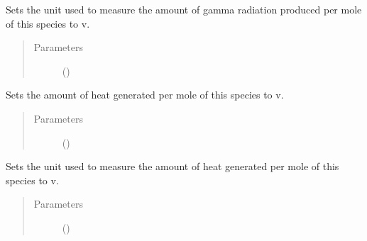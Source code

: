 \documentclass[letterpaper,10pt,openany,oneside,english]{sphinxmanual}
\begin{document}
\begin{fulllineitems}
\begin{fulllineitems}
\begin{quote}
\begin{description}
\end{description}\end{quote}

\end{fulllineitems}


\begin{fulllineitems}
\label{\detokenize{support_rst/specie:specie.Specie.SetMolarGammaPwrUnit}}
Sets the unit used to measure the amount of gamma radiation produced
per mole of this species to v.
\begin{quote}\begin{description}
\item[{Parameters}] \leavevmode
{} () \textendash{} 

\end{description}\end{quote}

\end{fulllineitems}


\begin{fulllineitems}
\label{\detokenize{support_rst/specie:specie.Specie.SetMolarHeatPwr}}
Sets the amount of heat generated per mole of this species to v.
\begin{quote}\begin{description}
\item[{Parameters}] \leavevmode
{} () \textendash{} 

\end{description}\end{quote}

\end{fulllineitems}


\begin{fulllineitems}
\label{\detokenize{support_rst/specie:specie.Specie.SetMolarHeatPwrUnit}}
Sets the unit used to measure the amount of heat generated per mole of
this species to v.
\begin{quote}\begin{description}
\item[{Parameters}] \leavevmode
{} () \textendash{} 


\end{description}
\end{quote}
\end{fulllineitems}
\end{fulllineitems}
\end{document}
